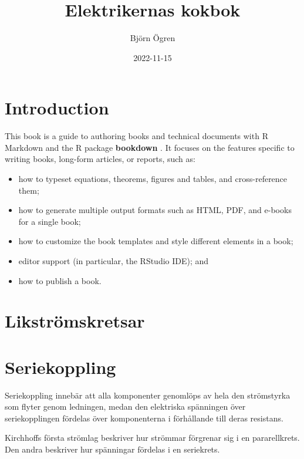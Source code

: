 \documentclass[
]{book}
\title{Elektrikernas kokbok}
\author{Björn Ögren}
\date{2022-11-15}
\providecommand{\tightlist}{%
  \setlength{\itemsep}{0pt}\setlength{\parskip}{0pt}}
\begin{document}
\maketitle

{
\setcounter{tocdepth}{1}
\tableofcontents
}
\hypertarget{introduction}{%
\chapter*{Introduction}\label{introduction}}

This book is a guide to authoring books and technical documents with R Markdown \citep{R-rmarkdown} and the R package \textbf{bookdown} \citep{R-bookdown}. It focuses on the features specific to writing books, long-form articles, or reports, such as:

\begin{itemize}
\tightlist
\item
  how to typeset equations, theorems, figures and tables, and cross-reference them;
\item
  how to generate multiple output formats such as HTML, PDF, and e-books for a single book;
\item
  how to customize the book templates and style different elements in a book;
\item
  editor support (in particular, the RStudio IDE); and
\item
  how to publish a book.
\end{itemize}

\hypertarget{likstruxf6mskretsar}{%
\chapter*{Likströmskretsar}\label{likstruxf6mskretsar}}

\hypertarget{seriekoppling}{%
\chapter{Seriekoppling}\label{seriekoppling}}

Seriekoppling innebär att alla komponenter genomlöps av hela den strömstyrka som flyter genom ledningen, medan den elektriska spänningen över seriekopplingen fördelas över komponenterna i förhållande till deras resistans.

Kirchhoffs första strömlag beskriver hur strömmar förgrenar sig i en pararellkrets.
Den andra beskriver hur spänningar fördelas i en seriekrets.
\end{document}

